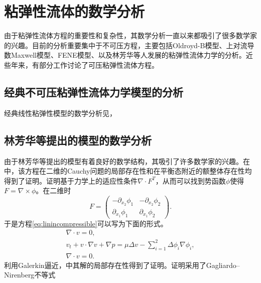 \documentclass{article}
\begin{document}
\section{粘弹性流体的数学分析}
由于粘弹性流体方程的重要性和复杂性，其数学分析一直以来都吸引了很多数学家的兴趣\cite{lin2012some,fabrizio1992mathematical,renardy2008mathematical,joseph1987hyperbolicity,guillope2010regular,saut2012lectures,yong2014newtonian,qian2010well,hu2011global,lei2005global,fang2014incompressible}。目前的分析重要集中于不可压方程，主要包括Oldroyd-B模型、上对流导数Maxwell模型、FENE模型、以及林芳华等人发展的粘弹性流体力学的分析\cite{elgindi2015global,saut2012lectures,renardy2000mathematical,masmoudi2011global,lions2000global,masmoudi2008well,lei2010remarks}。近些年来，有部分工作讨论了可压粘弹性流体方程\cite{fang2014incompressible,hu2012strong,qian2010global,qian2011initial}。
\subsection{经典不可压粘弹性流体力学模型的分析}
经典线性粘弹性模型的数学分析见，
\subsection{林芳华等提出的模型的数学分析}
由于林芳华等提出的模型有着良好的数学结构，其吸引了许多数学家的兴趣\cite{lin2005hydrodynamics,lebon2008classical,qian2010well,qian2011initial,hu2012formation,hu2015global}。在\cite{lin2005hydrodynamics}中，该方程在二维的Cauchy问题的局部存在性和在平衡态附近的额整体存在性均得到了证明。证明基于力学上的适应性条件$\nabla \cdot F^T$，从而可以找到势函数$\phi$使得$F = \nabla \times \phi$。在二维时
\begin{equation*}
	F = \left( \begin{matrix}
		-\partial_{x_2} \phi_1 &　-\partial_{x_2} \phi_2 \\
		\partial_{x_1} \phi_1 & \partial_{x_1} \phi_2
	\end{matrix}\right).
\end{equation*}
于是方程\eqref{eq:linincompressible}可以写为下面的形式。
\begin{eqnarray*}
	\nabla \cdot v = 0, \\
	v_t + v \cdot \nabla v + \nabla p =  \mu \Delta v - \sum_{i=1}^2 \Delta \phi_i \nabla \phi_i, \\
	\nabla \cdot v = 0.
\end{eqnarray*}
利用Galerkin逼近，\cite{lin2005hydrodynamics}中其解的局部存在性得到了证明。证明采用了Gagliardo–Nirenberg不等式
\end{document}
